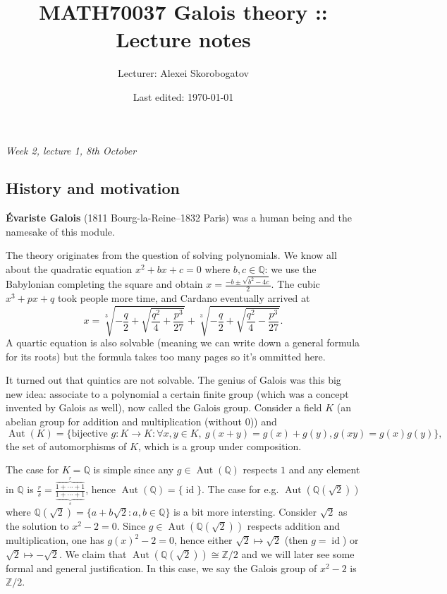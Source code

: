 \documentclass{article}
\title{MATH70037 Galois theory :: Lecture notes}
\author{Lecturer: Alexei Skorobogatov}
\date{Last edited: \today}
\newcommand{\Z}{\mathbb{Z}}
\newcommand{\Q}{\mathbb{Q}}
\newcommand{\Aut}{\operatorname{Aut}}
\newcommand{\id}{\operatorname{id}}
\theoremstyle{definition}
\begin{document}
\maketitle
\thispagestyle{empty}

\tableofcontents
\thispagestyle{empty}
\newpage
\setcounter{page}{1}

\begin{flushright}
\textit{Week 2, lecture 1, 8th October}
\end{flushright}

\subsection*{History and motivation}
\label{subsection:historymotivation}
\textbf{Évariste Galois} (1811 Bourg-la-Reine--1832 Paris) was a human being and the namesake of this module.

The theory originates from the question of solving polynomials. We know all about the quadratic equation $x^2+bx+c=0$ where $b,c\in\Q$: we use the Babylonian completing the square and obtain $\displaystyle x=\frac{-b\pm\sqrt{b^2-4c}}{2}$. The cubic $x^3+px+q$ took people more time, and Cardano eventually arrived at
\[
x=\sqrt[3]{-\frac{q}{2}+\sqrt{\frac{q^2}{4}+\frac{p^3}{27}}}+\sqrt[3]{-\frac{q}{2}+\sqrt{\frac{q^2}{4}-\frac{p^3}{27}}}.
\]
A quartic equation is also solvable (meaning we can write down a general formula for its roots) but the formula takes too many pages so it's ommitted here.

It turned out that quintics are not solvable. The genius of Galois was this big new idea: associate to a polynomial a certain finite group (which was a concept invented by Galois as well), now called the Galois group. Consider a field $K$ (an abelian group for addition and multiplication (without 0)) and
\[
\Aut(K)=\{\text{bijective }g:K\rightarrow K:\forall x,y\in K,\ g(x+y)=g(x)+g(y),g(xy)=g(x)g(y)\},
\]
the set of automorphisms of $K$, which is a group under composition.

The case for $K=\Q$ is simple since any $g\in\Aut(\Q)$ respects $1$ and any element in $\Q$ is $\frac{r}{s}=\frac{\overbrace{1+\cdots+1}^r}{\underbrace{1+\cdots+1}_s}$, hence $\Aut(\Q)=\{\id\}$. The case for e.g. $\Aut(\Q(\sqrt 2))$ where $\Q(\sqrt 2)=\{a+b\sqrt 2:a,b\in\Q\}$ is a bit more intersting. Consider $\sqrt2$ as the solution to $x^2-2=0$. Since $g\in\Aut(\Q(\sqrt 2))$ respects addition and multiplication, one has $g(x)^2-2=0$, hence either $\sqrt 2\mapsto\sqrt 2$ (then $g=\id$) or $\sqrt 2\mapsto-\sqrt 2$. We claim that $\Aut(\Q(\sqrt 2))\cong\Z/2$ and we will later see some formal and general justification. In this case, we say the Galois group of $x^2-2$ is $\Z/2$.
\end{document}

